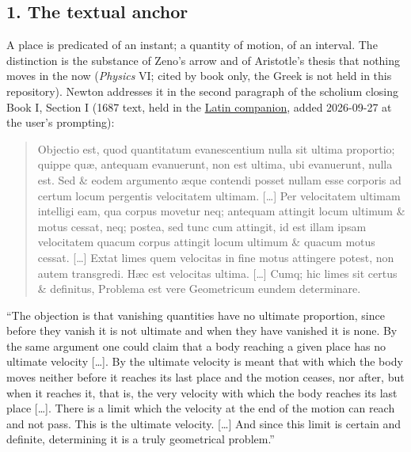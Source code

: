 \documentclass[11pt,a4paper]{article}
\begin{document}
\hypertarget{the-textual-anchor}{%
\subsection{1. The textual anchor}\label{the-textual-anchor}}

A place is predicated of an instant; a quantity of motion, of an
interval. The distinction is the substance of Zeno's arrow and of
Aristotle's thesis that nothing moves in the now (\emph{Physics} VI;
cited by book only, the Greek is not held in this repository). Newton
addresses it in the second paragraph of the scholium closing Book I,
Section I (1687 text, held in the
\href{../docs/classics/Newton_Principia_1687_BookI_SectI_scholia_la_wikisource.md}{Latin
companion}, added 2026-09-27 at the user's prompting):

\begin{quote}
Objectio est, quod quantitatum evanescentium nulla sit ultima proportio;
quippe quæ, antequam evanuerunt, non est ultima, ubi evanuerunt, nulla
est. Sed \& eodem argumento æque contendi posset nullam esse corporis ad
certum locum pergentis velocitatem ultimam. {[}\ldots{]} Per velocitatem
ultimam intelligi eam, qua corpus movetur neq; antequam attingit locum
ultimum \& motus cessat, neq; postea, sed tunc cum attingit, id est
illam ipsam velocitatem quacum corpus attingit locum ultimum \& quacum
motus cessat. {[}\ldots{]} Extat limes quem velocitas in fine motus
attingere potest, non autem transgredi. Hæc est velocitas ultima.
{[}\ldots{]} Cumq; hic limes sit certus \& definitus, Problema est vere
Geometricum eundem determinare.
\end{quote}

``The objection is that vanishing quantities have no ultimate
proportion, since before they vanish it is not ultimate and when they
have vanished it is none. By the same argument one could claim that a
body reaching a given place has no ultimate velocity {[}\ldots{]}. By
the ultimate velocity is meant that with which the body moves neither
before it reaches its last place and the motion ceases, nor after, but
when it reaches it, that is, the very velocity with which the body
reaches its last place {[}\ldots{]}. There is a limit which the velocity
at the end of the motion can reach and not pass. This is the ultimate
velocity. {[}\ldots{]} And since this limit is certain and definite,
determining it is a truly geometrical problem.''
\end{document}
